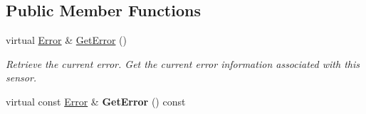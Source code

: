 \subsection*{Public Member Functions}
\begin{DoxyCompactItemize}
\item 
\hypertarget{classErrorBase_a2b5460a3e693a12b3023b096795f28cb}{
virtual \hyperlink{classError}{Error} \& \hyperlink{classErrorBase_a2b5460a3e693a12b3023b096795f28cb}{GetError} ()}
\label{classErrorBase_a2b5460a3e693a12b3023b096795f28cb}

\begin{DoxyCompactList}\small\item\em Retrieve the current error. Get the current error information associated with this sensor. \end{DoxyCompactList}\item 
\hypertarget{classErrorBase_aa365da53118bb3cd6c1fd4c42e6d90a3}{
virtual const \hyperlink{classError}{Error} \& {\bfseries GetError} () const }
\label{classErrorBase_aa365da53118bb3cd6c1fd4c42e6d90a3}


\end{DoxyCompactItemize}
